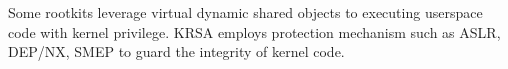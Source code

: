 \documentclass[conference]{IEEEtran}
\begin{document}
Some rootkits leverage virtual dynamic shared objects to executing userspace code with kernel privilege. KRSA employs protection mechanism such as ASLR, DEP/NX, SMEP to guard the integrity of kernel code.






\end{document}
